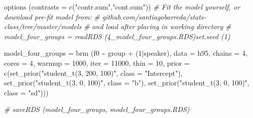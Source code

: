 \documentclass[
]{book}
\newenvironment{Shaded}{\begin{snugshade}}{\end{snugshade}}
\newcommand{\AttributeTok}[1]{\textcolor[rgb]{0.77,0.63,0.00}{#1}}
\newcommand{\CommentTok}[1]{\textcolor[rgb]{0.56,0.35,0.01}{\textit{#1}}}
\newcommand{\DecValTok}[1]{\textcolor[rgb]{0.00,0.00,0.81}{#1}}
\newcommand{\FunctionTok}[1]{\textcolor[rgb]{0.00,0.00,0.00}{#1}}
\newcommand{\NormalTok}[1]{#1}
\newcommand{\OtherTok}[1]{\textcolor[rgb]{0.56,0.35,0.01}{#1}}
\newcommand{\SpecialCharTok}[1]{\textcolor[rgb]{0.00,0.00,0.00}{#1}}
\newcommand{\StringTok}[1]{\textcolor[rgb]{0.31,0.60,0.02}{#1}}
\begin{document}
\begin{Shaded}
\begin{Highlighting}[]
\FunctionTok{options}\NormalTok{ (}\AttributeTok{contrasts =} \FunctionTok{c}\NormalTok{(}\StringTok{"contr.sum"}\NormalTok{,}\StringTok{"cont.sum"}\NormalTok{))}
\CommentTok{\# Fit the model yourself, or download pre{-}fit model from: }
\CommentTok{\# github.com/santiagobarreda/stats{-}class/tree/master/models}
\CommentTok{\# and load after placing in working directory}
\CommentTok{\#  model\_four\_groups = readRDS (\textquotesingle{}4\_model\_four\_groups.RDS\textquotesingle{})set.seed (1)}

\NormalTok{model\_four\_groups }\OtherTok{=}  
  \FunctionTok{brm}\NormalTok{ (f0 }\SpecialCharTok{\textasciitilde{}}\NormalTok{ group }\SpecialCharTok{+}\NormalTok{ (}\DecValTok{1}\SpecialCharTok{|}\NormalTok{speaker), }\AttributeTok{data =}\NormalTok{ h95, }\AttributeTok{chains =} \DecValTok{4}\NormalTok{, }\AttributeTok{cores =} \DecValTok{4}\NormalTok{, }
       \AttributeTok{warmup =} \DecValTok{1000}\NormalTok{, }\AttributeTok{iter =} \DecValTok{11000}\NormalTok{, }\AttributeTok{thin =} \DecValTok{10}\NormalTok{, }
       \AttributeTok{prior =} \FunctionTok{c}\NormalTok{(}\FunctionTok{set\_prior}\NormalTok{(}\StringTok{"student\_t(3, 200, 100)"}\NormalTok{, }\AttributeTok{class =} \StringTok{"Intercept"}\NormalTok{),}
                              \FunctionTok{set\_prior}\NormalTok{(}\StringTok{"student\_t(3, 0, 100)"}\NormalTok{, }\AttributeTok{class =} \StringTok{"b"}\NormalTok{),}
                              \FunctionTok{set\_prior}\NormalTok{(}\StringTok{"student\_t(3, 0, 100)"}\NormalTok{, }\AttributeTok{class =} \StringTok{"sd"}\NormalTok{)))}

\CommentTok{\#  saveRDS (model\_four\_groups, \textquotesingle{}model\_four\_groups.RDS\textquotesingle{})}
\end{Highlighting}
\end{Shaded}
\end{document}
